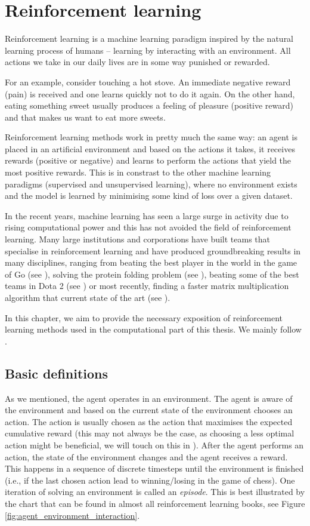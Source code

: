 \chapter{Reinforcement learning}
Reinforcement learning is a machine learning paradigm inspired by the natural learning process of humans -- learning by interacting with an environment. All actions we take in our daily lives are in some way punished or rewarded. 

For an example, consider touching a hot stove. An immediate negative reward (pain) is received and one learns quickly not to do it again. On the other hand, eating something sweet usually produces a feeling of pleasure (positive reward) and that makes us want to eat more sweets. 

Reinforcement learning methods work in pretty much the same way: an agent is placed in an artificial environment and based on the actions it takes, it receives rewards (positive or negative) and learns to perform the actions that yield the most positive rewards. This is in constrast to the other machine learning paradigms (supervised and unsupervised learning), where no environment exists and the model is learned by minimising some kind of loss over a given dataset. 

In the recent years, machine learning has seen a large surge in activity due to rising computational power and this has not avoided the field of reinforcement learning. Many large institutions and corporations have built teams that specialise in reinforcement learning and have produced groundbreaking results in many disciplines, ranging from beating the best player in the world in the game of Go (see \cite{alphago_paper}), solving the protein folding problem (see \cite{alphafold}), beating some of the best teams in Dota 2 (see \cite{openaifive}) or most recently, finding a faster matrix multiplication algorithm that current state of the art (see \cite{matrix_multiplication}).

In this chapter, we aim to provide the necessary exposition of reinforcement learning methods used in the computational part of this thesis. We mainly follow \cite{sutton2018reinforcement}.

\section{Basic definitions}
As we mentioned, the agent operates in an environment. The agent is aware of the environment and based on the current state of the environment chooses an action. The action is usually chosen as the action that maximises the expected cumulative reward (this may not always be the case, as choosing a less optimal action might be beneficial, we will touch on this in ). After the agent performs an action, the state of the environment changes and the agent receives a reward. This happens in a sequence of discrete timesteps until the environment is finished (i.e., if the last chosen action lead to winning/losing in the game of chess). One iteration of solving an environment is called an \textit{episode}. This is best illustrated by the chart that can be found in almost all reinforcement learning books, see Figure \ref{fig:agent_environment_interaction}.

